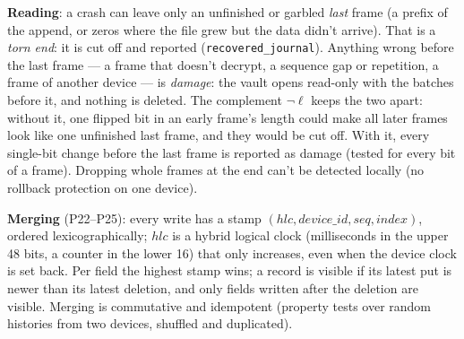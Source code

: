 \documentclass[11pt,a4paper]{article}
\newcommand{\dref}[1]{\textsf{#1}} %
\begin{document}
\noindent\textbf{Reading}: a crash can leave only an unfinished or garbled \emph{last} frame (a prefix of the append, or zeros where the file grew but the data didn't arrive). That is a \emph{torn end}: it is cut off and reported (\texttt{recovered\_journal}). Anything wrong before the last frame --- a frame that doesn't decrypt, a sequence gap or repetition, a frame of another device --- is \emph{damage}: the vault opens read-only with the batches before it, and nothing is deleted. The complement $\lnot\ell$ keeps the two apart: without it, one flipped bit in an early frame's length could make all later frames look like one unfinished last frame, and they would be cut off. With it, every single-bit change before the last frame is reported as damage (tested for every bit of a frame). Dropping whole frames at the end can't be detected locally (no rollback protection on one device).

\noindent\textbf{Merging} (\dref{P22}--\dref{P25}): every write has a stamp $(\mathit{hlc}, \mathit{device\_id}, \mathit{seq}, \mathit{index})$, ordered lexicographically; $\mathit{hlc}$ is a hybrid logical clock (milliseconds in the upper 48 bits, a counter in the lower 16) that only increases, even when the device clock is set back. Per field the highest stamp wins; a record is visible if its latest put is newer than its latest deletion, and only fields written after the deletion are visible. Merging is commutative and idempotent (property tests over random histories from two devices, shuffled and duplicated).
\end{document}
